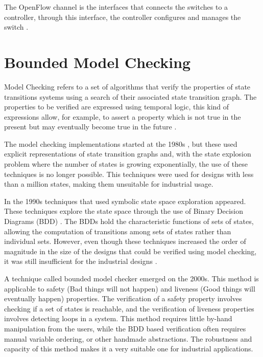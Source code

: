 The OpenFlow channel is the interfaces that connects the switches to a controller, through this interface, the controller configures and manages the switch \cite{openflow2011openflow}.



\section{Bounded Model Checking}
%

Model Checking refers to a set of algorithms that verify the properties of state transitions systems using a search of their associated state transition graph. The properties to be verified are expressed using temporal logic, this kind of expressions allow, for example, to assert a property which is not true in the present but may eventually become true in the future \cite{clarke2001bounded}.

The model checking implementations started at the 1980s \cite{clarke1986automatic}, but these used explicit representations of state transition graphs and, with the state explosion problem where the number of states is growing exponentially, the use of these techniques is no longer possible. This techniques were used for designs with less than a million states, making them unsuitable for industrial usage.

In the 1990s techniques that used symbolic state space exploration appeared. These techniques explore the state space through the use of Binary Decision Diagrams (BDD) \cite{burch1992symbolic}. The BDDs hold the characteristic functions of sets of states, allowing the computation of transitions among sets of states rather than individual sets. However, even though these techniques increased the order of magnitude in the size of the designs that could be verified using model checking, it was still insufficient for the industrial designs \cite{clarke2001bounded}.

A technique called bounded model checker emerged on the 2000s. This method is applicable to safety (Bad things will not happen) and liveness (Good things will eventually happen) properties. The verification of a safety property involves checking if a set of states is reachable, and the verification of liveness properties involves detecting loops in a system. This method requires little by-hand manipulation from the users, while the BDD based verification often requires manual variable ordering, or other handmade abstractions. The robustness and capacity of this method makes it a very suitable one for industrial applications.

